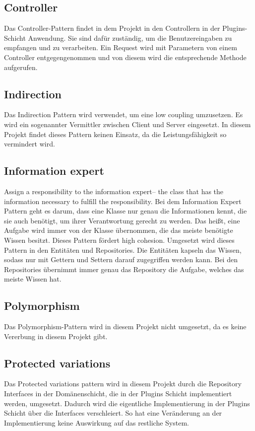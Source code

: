     \subsection{Controller}
    Das Controller-Pattern findet in dem Projekt in den Controllern in der Plugins-Schicht Anwendung. Sie sind dafür zuständig, um die Benutzereingaben zu empfangen und zu verarbeiten. Ein Request wird mit Parametern von einem Controller entgegengenommen und von diesem wird die entsprechende Methode aufgerufen.
    
    \subsection{Indirection}
    Das Indirection Pattern wird verwendet, um eine low coupling umzusetzen. Es wird ein sogenannter Vermittler zwischen Client und Server eingesetzt. In diesem Projekt findet dieses Pattern keinen Einsatz, da die Leistungsfähigkeit so vermindert wird.
    
    \subsection{Information expert}
    Assign a responsibility to the information expert– the class that has the information necessary to fulfill the responsibility.
    Bei dem Information Expert Pattern geht es darum, dass eine Klasse nur genau die Informationen kennt, die sie auch benötigt, um ihrer Verantwortung gerecht zu werden. Das heißt, eine Aufgabe wird immer von der Klasse übernommen, die das meiste benötigte Wissen besitzt. Dieses Pattern fördert high cohesion. Umgesetzt wird dieses Pattern in den Entitäten und Repositories. Die Entitäten kapseln das Wissen, sodass nur mit Gettern und Settern darauf zugegriffen werden kann. Bei den Repositories übernimmt immer genau das Repository die Aufgabe, welches das meiste Wissen hat.
    
    \subsection{Polymorphism}
    Das Polymorphism-Pattern wird in diesem Projekt nicht umgesetzt, da es keine Vererbung in diesem Projekt gibt.
    
    \subsection{Protected variations}
    Das Protected variations pattern wird in diesem Projekt durch die Repository Interfaces in der Domänenschicht, die in der Plugins Schicht implementiert werden, umgesetzt. Dadurch wird die eigentliche Implementierung in der Plugins Schicht über die Interfaces verschleiert. So hat eine Veränderung an der Implementierung keine Auswirkung auf das restliche System.
    
